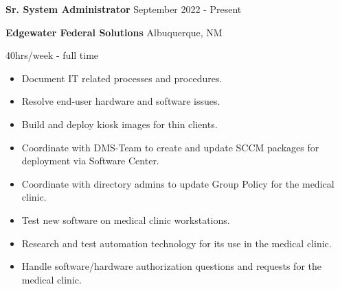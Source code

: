 \documentclass[../main.tex]{subfiles}
\begin{document}
    \textbf{Sr. System Administrator}
    \hfill
    September 2022 - Present
    
    \textbf{Edgewater Federal Solutions}
    \hfill
    Albuquerque, NM
    
    \hfill
    40hrs/week - full time
    \begin{itemize}
        \item Document IT related processes and procedures.
        \item Resolve end-user hardware and software issues.
        \item Build and deploy kiosk images for thin clients.
        \item Coordinate with DMS-Team to create and update SCCM packages for deployment via Software Center.
        \item Coordinate with directory admins to update Group Policy for the medical clinic.
        \item Test new software on medical clinic workstations.
        \item Research and test automation technology for its use in the medical clinic.
        \item Handle software/hardware authorization questions and requests for the medical clinic.
    \end{itemize}
\end{document}
